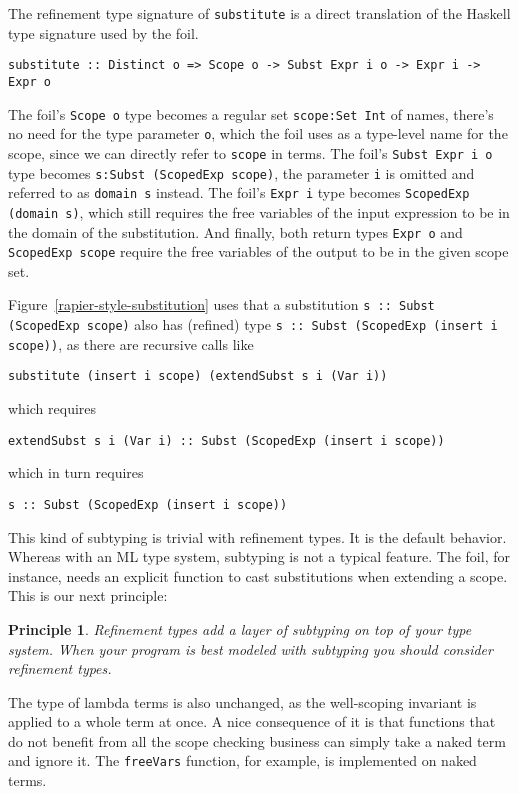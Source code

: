 \documentclass[sigconf]{acmart}
\newcommand{\tc}[1]{{\small\texttt{#1}}}
\newtheorem{principle}{Principle}
\begin{document}
The refinement type signature of \tc{substitute} is a direct translation of the
Haskell type signature used by the foil.
\begin{verbatim}
substitute :: Distinct o => Scope o -> Subst Expr i o -> Expr i -> Expr o
\end{verbatim}
The foil's \tc{Scope o} type becomes a
regular set \tc{scope:Set Int} of names, there's no need for the type parameter
\tc{o}, which the foil uses as a type-level name for the scope, since we can directly refer to \tc{scope} in terms. The foil's \tc{Subst Expr i o} type
becomes \tc{s:Subst (ScopedExp scope)}, the parameter \tc{i} is omitted and
referred to as \tc{domain s} instead. The foil's \tc{Expr i} type becomes
\tc{ScopedExp (domain s)}, which still requires the free variables of the input
expression to be in the domain of the substitution. And finally, both return types
\tc{Expr o} and \tc{ScopedExp scope} require the free variables of the output to
be in the given scope set.

Figure~\ref{rapier-style-substitution} uses that a substitution
\tc{s :: Subst (ScopedExp scope)}
also has (refined) type
\tc{s :: Subst (ScopedExp (insert i scope))},
as there are recursive calls like
\begin{verbatim}
substitute (insert i scope) (extendSubst s i (Var i))
\end{verbatim}
which requires
\begin{verbatim}
extendSubst s i (Var i) :: Subst (ScopedExp (insert i scope))
\end{verbatim}
which in turn requires
\begin{verbatim}
s :: Subst (ScopedExp (insert i scope))
\end{verbatim}
This kind of subtyping is trivial with refinement types. It is the default
behavior. Whereas with an ML type system, subtyping is not a typical feature. The
foil, for instance, needs an explicit function to cast substitutions when
extending a scope. This is our next principle:
\begin{principle}
  Refinement types add a layer of subtyping on top of your type system. When
  your program is best modeled with subtyping you should consider refinement
  types.
\end{principle}

The type of lambda terms is also unchanged, as the well-scoping invariant is
applied to a whole term at once. A nice consequence of it is that functions
that do not benefit from all the scope checking business can simply take a naked
term and ignore it. The \tc{freeVars} function, for example, is implemented on
naked terms.
\end{document}
